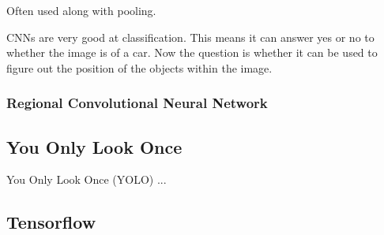 Often used along with pooling.

CNNs are very good at classification. 
This means it can answer yes or no to whether the image is of a car.
Now the question is whether it can be used to figure out the position of the objects within the image.
  


\subsubsection{Regional Convolutional Neural Network}

\subsection{You Only Look Once}
You Only Look Once (YOLO) ...

\subsection{Tensorflow}


